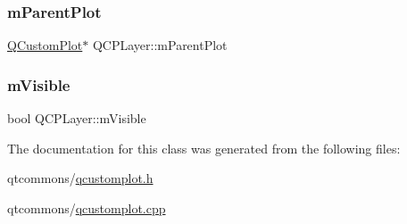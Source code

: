 \mbox{\label{class_q_c_p_layer_a2f3374a7884bf403720cd1cf6f7ad1bb}} 
\subsubsection{\texorpdfstring{mParentPlot}{mParentPlot}}
{\footnotesize\ttfamily \mbox{\hyperlink{class_q_custom_plot}{Q\+Custom\+Plot}}$\ast$ Q\+C\+P\+Layer\+::m\+Parent\+Plot\hspace{0.3cm}{\ttfamily [protected]}}

\mbox{\label{class_q_c_p_layer_a264950deb08e589460c126c895a1e2b5}} 
\subsubsection{\texorpdfstring{mVisible}{mVisible}}
{\footnotesize\ttfamily bool Q\+C\+P\+Layer\+::m\+Visible\hspace{0.3cm}{\ttfamily [protected]}}



The documentation for this class was generated from the following files\+:\begin{DoxyCompactItemize}
\item 
qtcommons/\mbox{\hyperlink{qcustomplot_8h}{qcustomplot.\+h}}\item 
qtcommons/\mbox{\hyperlink{qcustomplot_8cpp}{qcustomplot.\+cpp}}\end{DoxyCompactItemize}
